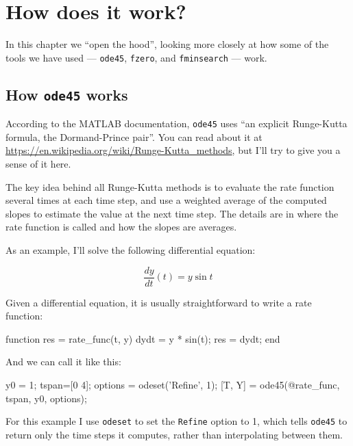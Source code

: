\documentclass[main.tex]{subfiles}
\begin{document}
\chapter{How does it work?}
\label{chpt:how}

In this chapter we ``open the hood'', looking more closely at how some of the tools we have used --- {\tt ode45}, {\tt fzero}, and {\tt fminsearch} --- work.


\section{How {\tt ode45} works}
\label{sect:howode45}

According to the MATLAB documentation, {\tt ode45} uses ``an explicit Runge-Kutta formula, the Dormand-Prince pair''.  You can read about it at \url{https://en.wikipedia.org/wiki/Runge-Kutta_methods}, but I'll try to give you a sense of it here.


The key idea behind all Runge-Kutta methods is to evaluate the rate function several times at each time step, and use a weighted average of the computed slopes to estimate the value at the next time step.  The details are in where the rate function is called and how the slopes are averages.


As an example, I'll solve the following differential equation:

\[ \frac{dy}{dt}(t) = y \sin t \] 

Given a differential equation, it is usually straightforward to write a rate function:

\begin{code}
function res = rate_func(t, y)
    dydt = y * sin(t);
    res = dydt;
end
\end{code}

And we can call it like this:

\begin{code}
    y0 = 1;
    tspan=[0 4];
    options = odeset('Refine', 1);
    [T, Y] = ode45(@rate_func, tspan, y0, options);
\end{code}

For this example I use {\tt odeset} to set the {\tt Refine} option to 1, which tells {\tt ode45} to return only the time steps it computes, rather than interpolating between them.
\end{document}
